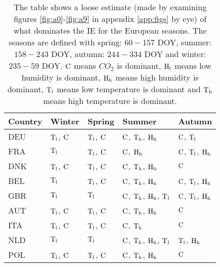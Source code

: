 \documentclass[fleqn,usenatbib,nofootinbib]{revtex4-2}
\begin{document}
	\begin{table}[H]
		\centering
		\caption{The table shows a loose estimate (made by examining figures \ref{fig:a0}-\ref{fig:a9} in appendix \ref{app:figs} by eye) of what dominates the IE for the European seasons. The seasons are defined with spring: $60-157$ DOY, summer: $158-243$ DOY, autumn: $244-334$ DOY and winter: $235-59$ DOY. $\rm C$ means $CO_2$ is dominant, $\rm H_{l}$ means low humidity is dominant, $\rm H_{h}$ means high humidity is dominant, $\rm T_{l}$ means low temperature is dominant and $\rm T_{h}$ means high temperature is dominant.}
		\label{tab:results2}
		\begin{tabular}{l l l l l }
			\hline
			Country & Winter & Spring  & Summer  & Autumn    \\
			\hline
			DEU & $\rm T_{l}$, $\rm C$ & $\rm T_{l}$, $\rm C$ & $\rm C$, $\rm T_{h}$, $\rm H_h$ & $\rm C$, $\rm T_l$  \\
			FRA & $\rm T_{l}$ 		   & $\rm T_{l}$, $\rm C$ & $\rm C$, $\rm H_h$ 				& $\rm C$, $\rm T_l$, $\rm H_h$   \\
			DNK & $\rm T_{l}$, $\rm C$ & $\rm T_{l}$, $\rm C$ & $\rm C$, $\rm T_{h}$, $\rm H_h$ & $\rm C$   \\
			BEL & $\rm T_{l}$		   & $\rm T_{l}$, $\rm C$ & $\rm C$, $\rm T_{h}$, $\rm H_h$ & $\rm C$, $\rm T_l$, $\rm H_h$  \\
			GBR & $\rm T_{l}$          & $\rm T_{l}$          & $\rm C$, $\rm T_{h}$, $\rm H_h$, $\rm T_{l}$  & $\rm C$, $\rm T_l$, $\rm H_h$   \\
			AUT & $\rm T_{l}$, $\rm C$ & $\rm T_{l}$, $\rm C$ & $\rm C$, $\rm T_{h}$, $\rm H_h$ & $\rm C$   \\
			ITA & $\rm T_{l}$, $\rm C$ & $\rm T_{l}$, $\rm C$ & $\rm C$, $\rm T_{h}$ 	        & $\rm C$ \\
			NLD & $\rm T_{l}$          & $\rm T_{l}$ 		  & $\rm C$, $\rm T_{h}$, $\rm H_h$, $\rm T_{l}$    & $\rm T_l$, $\rm H_h$   \\
			POL & $\rm T_{l}$, $\rm C$ & $\rm T_{l}$, $\rm C$ & $\rm C$, $\rm T_{h}$, $\rm H_h$ &  $\rm C$   \\
			\hline
		\end{tabular}
	\end{table}
	
\end{document}

